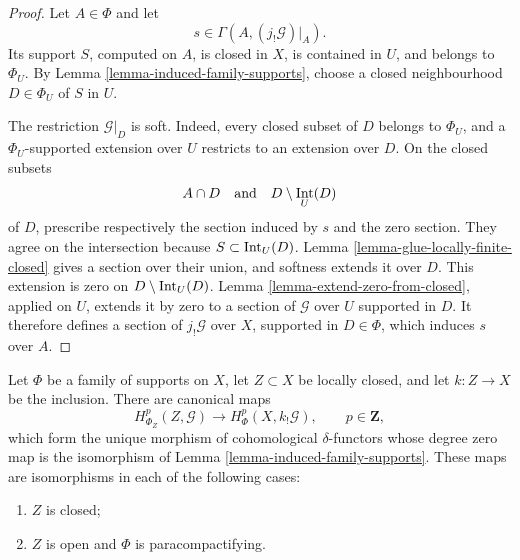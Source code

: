\begin{proof}
Let $A\in\Phi$ and let
$$
s\in\Gamma(A,(j_!\mathcal{G})|_A).
$$
Its support $S$, computed on $A$, is closed in $X$, is contained in
$U$, and belongs to $\Phi_U$. By Lemma
\ref{lemma-induced-family-supports}, choose a closed neighbourhood
$D\in\Phi_U$ of $S$ in $U$.

The restriction $\mathcal{G}|_D$ is soft. Indeed, every closed subset of
$D$ belongs to $\Phi_U$, and a $\Phi_U$-supported extension over $U$
restricts to an extension over $D$. On the closed subsets
$$
A\cap D\quad\text{and}\quad D\setminus\mathop{\rm Int}_U(D)
$$
of $D$, prescribe respectively the section induced by $s$ and the zero
section. They agree on the intersection because
$S\subset\mathop{\rm Int}_U(D)$. Lemma
\ref{lemma-glue-locally-finite-closed} gives a section over their union,
and softness extends it over $D$. This extension is zero on
$D\setminus\mathop{\rm Int}_U(D)$. Lemma
\ref{lemma-extend-zero-from-closed}, applied on $U$, extends it by zero
to a section of $\mathcal{G}$ over $U$ supported in $D$. It therefore
defines a section of $j_!\mathcal{G}$ over $X$, supported in
$D\in\Phi$, which induces $s$ over $A$.
\end{proof}

\begin{lemma}
\label{lemma-family-supports-extension-by-zero}
\begin{reference}
\cite[Chapter III, \S 3.5, Theorem 3.5.1, pp. 166--167]{Tohoku}
\end{reference}
Let $\Phi$ be a family of supports on $X$, let $Z\subset X$ be locally
closed, and let $k:Z\to X$ be the inclusion. There are canonical maps
$$
H^p_{\Phi_Z}(Z,\mathcal{G})
\longrightarrow H^p_\Phi(X,k_!\mathcal{G}),
\qquad p\in\mathbf{Z},
$$
which form the unique morphism of cohomological $\delta$-functors whose
degree zero map is the isomorphism of Lemma
\ref{lemma-induced-family-supports}. These maps are isomorphisms in each
of the following cases:
\begin{enumerate}
\item $Z$ is closed;
\item $Z$ is open and $\Phi$ is paracompactifying.
\end{enumerate}
\end{lemma}

